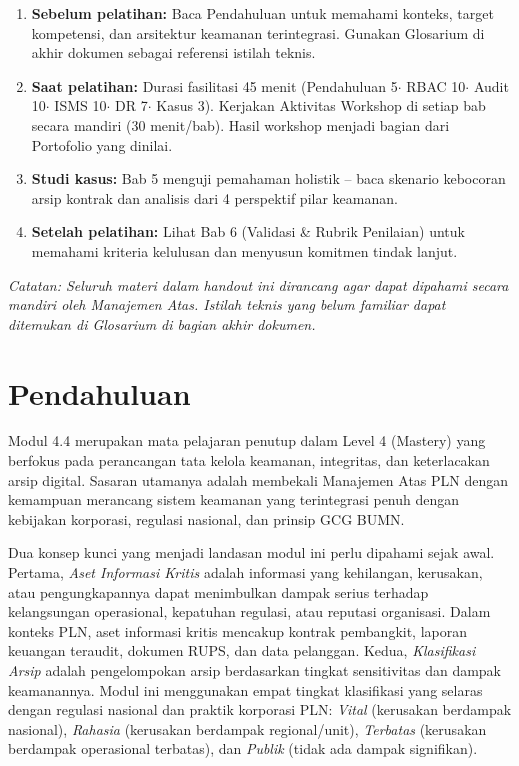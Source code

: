 \documentclass[12pt,a4paper]{report}
\begin{document}
\begin{plnbox}
\begin{enumerate}[leftmargin=*]
    \item \textbf{Sebelum pelatihan:} Baca Pendahuluan untuk memahami konteks, target kompetensi, dan arsitektur keamanan terintegrasi. Gunakan Glosarium di akhir dokumen sebagai referensi istilah teknis.
    \item \textbf{Saat pelatihan:} Durasi fasilitasi 45 menit (Pendahuluan 5$\cdot$ RBAC 10$\cdot$ Audit 10$\cdot$ ISMS 10$\cdot$ DR 7$\cdot$ Kasus 3). Kerjakan Aktivitas Workshop di setiap bab secara mandiri (30 menit/bab). Hasil workshop menjadi bagian dari Portofolio yang dinilai.
    \item \textbf{Studi kasus:} Bab 5 menguji pemahaman holistik -- baca skenario kebocoran arsip kontrak dan analisis dari 4 perspektif pilar keamanan.
    \item \textbf{Setelah pelatihan:} Lihat Bab 6 (Validasi \& Rubrik Penilaian) untuk memahami kriteria kelulusan dan menyusun komitmen tindak lanjut.
\end{enumerate}
\end{plnbox}

\vspace{0.5cm}
\noindent\small\textit{Catatan: Seluruh materi dalam handout ini dirancang agar dapat dipahami secara mandiri oleh Manajemen Atas. Istilah teknis yang belum familiar dapat ditemukan di Glosarium di bagian akhir dokumen.}

\tableofcontents

\chapter*{Pendahuluan}
\setcounter{section}{0}
\renewcommand{\thesection}{\Alph{section}}
Modul 4.4 merupakan mata pelajaran penutup dalam Level 4 (Mastery) yang berfokus pada perancangan tata kelola keamanan, integritas, dan keterlacakan arsip digital. Sasaran utamanya adalah membekali Manajemen Atas PLN dengan kemampuan merancang sistem keamanan yang terintegrasi penuh dengan kebijakan korporasi, regulasi nasional, dan prinsip GCG BUMN.

Dua konsep kunci yang menjadi landasan modul ini perlu dipahami sejak awal. Pertama, \textit{Aset Informasi Kritis} adalah informasi yang kehilangan, kerusakan, atau pengungkapannya dapat menimbulkan dampak serius terhadap kelangsungan operasional, kepatuhan regulasi, atau reputasi organisasi. Dalam konteks PLN, aset informasi kritis mencakup kontrak pembangkit, laporan keuangan teraudit, dokumen RUPS, dan data pelanggan. Kedua, \textit{Klasifikasi Arsip} adalah pengelompokan arsip berdasarkan tingkat sensitivitas dan dampak keamanannya. Modul ini menggunakan empat tingkat klasifikasi yang selaras dengan regulasi nasional dan praktik korporasi PLN: \textit{Vital} (kerusakan berdampak nasional), \textit{Rahasia} (kerusakan berdampak regional/unit), \textit{Terbatas} (kerusakan berdampak operasional terbatas), dan \textit{Publik} (tidak ada dampak signifikan).
\end{document}
